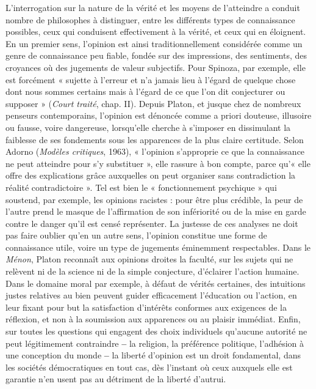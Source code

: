 L'interrogation sur la nature de la vérité
et les moyens de l’atteindre a conduit
nombre de philosophes à distinguer,
entre les différents types de connaissance
possibles, ceux qui conduisent effectivement
à la vérité, et ceux qui en éloignent.
En un premier sens, l’opinion est ainsi
traditionnellement considérée comme un
genre de connaissance peu fiable, fondée
sur des impressions, des sentiments, des
croyances où des jugements de valeur
subjectifs. Pour Spinoza, par exemple,
elle est forcément « sujette à l'erreur et n’a
jamais lieu à l'égard de quelque chose
dont nous sommes certains mais à l'égard
de ce que l’on dit conjecturer ou supposer »
({\it Court traité}, chap. II). Depuis Platon,
et jusque chez de nombreux penseurs
contemporains, l'opinion est
dénoncée comme a priori douteuse, illusoire
ou fausse, voire dangereuse, lorsqu’elle
cherche à s'imposer en dissimulant
la faiblesse de ses fondements sous
les apparences de la plus claire certitude.
Selon Adorno ({\it Modèles critiques}, 1963),
« l'opinion s’approprie ce que la connaissance
ne peut atteindre pour s’y substituer »,
elle rassure à bon compte, parce
qu’« elle offre des explications grâce auxquelles
on peut organiser sans contradiction
la réalité contradictoire ». Tel est bien
le « fonctionnement psychique » qui soustend,
par exemple, les opinions racistes :
pour être plus crédible, la peur de l’autre
prend le masque de l'affirmation de son
infériorité ou de la mise en garde contre
le danger qu'il est censé représenter. La
justesse de ces analyses ne doit pas faire
oublier qu'en un autre sens, l'opinion
constitue une forme de connaissance
utile, voire un type de jugements éminemment
respectables. Dans le {\it Ménon},
Platon reconnaît aux opinions droites la
faculté, sur les sujets qui ne relèvent ni de
la science ni de la simple conjecture,
d'éclairer l’action humaine. Dans le
domaine moral par exemple, à défaut de
vérités certaines, des intuitions justes
relatives au bien peuvent guider efficacement
l'éducation ou l’action, en leur
fixant pour but la satisfaction d'intérêts
conformes aux exigences de la réflexion,
et non à la soumission aux apparences ou
au plaisir immédiat. Enfin, sur toutes les
questions qui engagent des choix individuels
qu'aucune autorité ne peut légitimement
contraindre {\bf --} la religion, la
préférence politique, l'adhésion à une
conception du monde {\bf --} la liberté d’opinion
est un droit fondamental, dans les
sociétés démocratiques en tout cas, dès
l'instant où ceux auxquels elle est garantie
n'en usent pas au détriment de la
liberté d'autrui.

